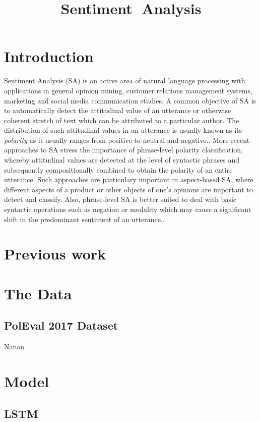 \documentclass[10pt, a4paper]{article}
\title{Sentiment Analysis}
\begin{document}
\maketitleabstract

\section{Introduction}   
Sentiment Analysis (SA) is an active area of natural language processing with applications in general opinion mining, customer relations management systems, marketing and social media communication studies. A common objective of SA is to automatically detect the attitudinal value of an utterance or otherwise coherent stretch of text which can be attributed to a particular author. The distribution of  such attitudinal values in an utterance is usually known as its \textit{polarity} as it usually ranges from positive to neutral and negative.\cite{cambria_schuller}. More recent approaches to SA stress the importance of phrase-level polarity classification, whereby attitudinal values are detected at the level of syntactic phrases and subsequently compositionally combined to obtain the polarity of an entire utterance. Such approaches are particulary important in aspect-based SA, where different aspects of a product or other objects of one's opinions are important to detect and classify. Also, phrase-level SA is better suited to deal with basic syntactic operations such as negation or modality which may cause a significant shift in the predominant sentiment of an utterance.\cite{wilson_wiebe}. 

\section{Previous work}




\section{The Data}
\subsection{PolEval 2017 Dataset}

Nanan 


\section{Model} 


\subsection{LSTM}
\end{document}
